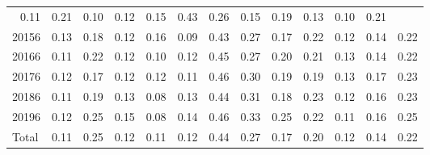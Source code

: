 \begin{table}[!h]
\begin{tabular}{lllllllllllll}
  \multicolumn{1}{|r}{0.11} &
  \multicolumn{1}{r}{0.21} &
  \multicolumn{1}{r}{0.10} &
  \multicolumn{1}{r}{0.12} &
  \multicolumn{1}{r}{0.15} &
  \multicolumn{1}{r}{0.43} &
  \multicolumn{1}{r}{0.26} &
  \multicolumn{1}{r}{0.15} &
  \multicolumn{1}{r}{0.19} &
  \multicolumn{1}{r}{0.13} &
  \multicolumn{1}{r}{0.10} &
  \multicolumn{1}{r}{0.21} \\
\multicolumn{1}{l}{\hspace{1em}20156} &
  \multicolumn{1}{|r}{0.13} &
  \multicolumn{1}{r}{0.18} &
  \multicolumn{1}{r}{0.12} &
  \multicolumn{1}{r}{0.16} &
  \multicolumn{1}{r}{0.09} &
  \multicolumn{1}{r}{0.43} &
  \multicolumn{1}{r}{0.27} &
  \multicolumn{1}{r}{0.17} &
  \multicolumn{1}{r}{0.22} &
  \multicolumn{1}{r}{0.12} &
  \multicolumn{1}{r}{0.14} &
  \multicolumn{1}{r}{0.22} \\
\multicolumn{1}{l}{\hspace{1em}20166} &
  \multicolumn{1}{|r}{0.11} &
  \multicolumn{1}{r}{0.22} &
  \multicolumn{1}{r}{0.12} &
  \multicolumn{1}{r}{0.10} &
  \multicolumn{1}{r}{0.12} &
  \multicolumn{1}{r}{0.45} &
  \multicolumn{1}{r}{0.27} &
  \multicolumn{1}{r}{0.20} &
  \multicolumn{1}{r}{0.21} &
  \multicolumn{1}{r}{0.13} &
  \multicolumn{1}{r}{0.14} &
  \multicolumn{1}{r}{0.22} \\
\multicolumn{1}{l}{\hspace{1em}20176} &
  \multicolumn{1}{|r}{0.12} &
  \multicolumn{1}{r}{0.17} &
  \multicolumn{1}{r}{0.12} &
  \multicolumn{1}{r}{0.12} &
  \multicolumn{1}{r}{0.11} &
  \multicolumn{1}{r}{0.46} &
  \multicolumn{1}{r}{0.30} &
  \multicolumn{1}{r}{0.19} &
  \multicolumn{1}{r}{0.19} &
  \multicolumn{1}{r}{0.13} &
  \multicolumn{1}{r}{0.17} &
  \multicolumn{1}{r}{0.23} \\
\multicolumn{1}{l}{\hspace{1em}20186} &
  \multicolumn{1}{|r}{0.11} &
  \multicolumn{1}{r}{0.19} &
  \multicolumn{1}{r}{0.13} &
  \multicolumn{1}{r}{0.08} &
  \multicolumn{1}{r}{0.13} &
  \multicolumn{1}{r}{0.44} &
  \multicolumn{1}{r}{0.31} &
  \multicolumn{1}{r}{0.18} &
  \multicolumn{1}{r}{0.23} &
  \multicolumn{1}{r}{0.12} &
  \multicolumn{1}{r}{0.16} &
  \multicolumn{1}{r}{0.23} \\
\multicolumn{1}{l}{\hspace{1em}20196} &
  \multicolumn{1}{|r}{0.12} &
  \multicolumn{1}{r}{0.25} &
  \multicolumn{1}{r}{0.15} &
  \multicolumn{1}{r}{0.08} &
  \multicolumn{1}{r}{0.14} &
  \multicolumn{1}{r}{0.46} &
  \multicolumn{1}{r}{0.33} &
  \multicolumn{1}{r}{0.25} &
  \multicolumn{1}{r}{0.22} &
  \multicolumn{1}{r}{0.11} &
  \multicolumn{1}{r}{0.16} &
  \multicolumn{1}{r}{0.25} \\
\multicolumn{1}{l}{\hspace{1em}Total} &
  \multicolumn{1}{|r}{0.11} &
  \multicolumn{1}{r}{0.25} &
  \multicolumn{1}{r}{0.12} &
  \multicolumn{1}{r}{0.11} &
  \multicolumn{1}{r}{0.12} &
  \multicolumn{1}{r}{0.44} &
  \multicolumn{1}{r}{0.27} &
  \multicolumn{1}{r}{0.17} &
  \multicolumn{1}{r}{0.20} &
  \multicolumn{1}{r}{0.12} &
  \multicolumn{1}{r}{0.14} &
  \multicolumn{1}{r}{0.22} \\
\cline{1-13}
\end{tabular}
\end{table}
